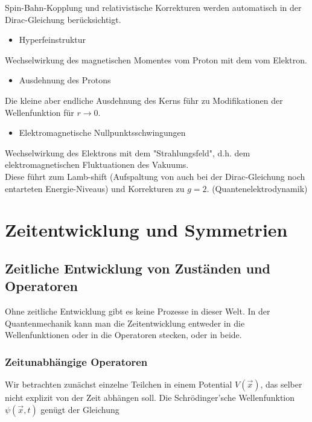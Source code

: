 \documentclass[10pt, letterpaper]{article}
\begin{document}
Spin-Bahn-Kopplung und relativistische Korrekturen werden automatisch in der Dirac-Gleichung berücksichtigt.

\begin{itemize}
  \item Hyperfeinstruktur
\end{itemize}

Wechselwirkung des magnetischen Momentes vom Proton mit dem vom Elektron.

\begin{itemize}
  \item Ausdehnung des Protons
\end{itemize}

Die kleine aber endliche Ausdehnung des Kerns führ zu Modifikationen der Wellenfunktion für $r \rightarrow 0$.

\begin{itemize}
  \item Elektromagnetische Nullpunktsschwingungen
\end{itemize}

Wechselwirkung des Elektrons mit dem "Strahlungsfeld", d.h. dem elektromagnetischen Fluktuationen des Vakuums.\\
Diese führt zum Lamb-shift (Aufspaltung von auch bei der Dirac-Gleichung noch entarteten Energie-Niveaus) und Korrekturen zu $g=2$. (Quantenelektrodynamik)

\pagebreak


\section{Zeitentwicklung und Symmetrien}



\subsection*{Zeitliche Entwicklung von Zuständen und Operatoren}
Ohne zeitliche Entwicklung gibt es keine Prozesse in dieser Welt. In der Quantenmechanik kann man die Zeitentwicklung entweder in die Wellenfunktionen oder in die Operatoren stecken, oder in beide.

\subsubsection*{Zeitunabhängige Operatoren}
Wir betrachten zunächst einzelne Teilchen in einem Potential $V(\vec{x})$, das selber nicht explizit von der Zeit abhängen soll. Die Schrödinger'sche Wellenfunktion $\psi(\vec{x}, t)$ genügt der Gleichung
\end{document}
